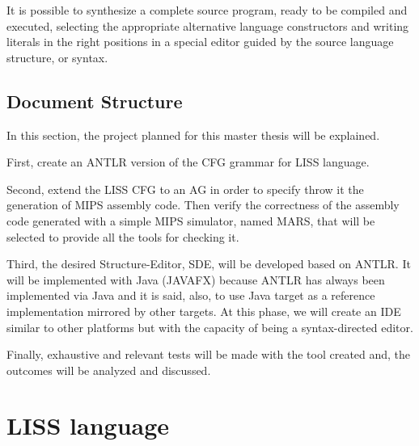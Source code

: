 \documentclass[
  oneside,
  11pt, a4paper,
  footinclude=true,
  headinclude=true,
  cleardoublepage=empty
]{scrbook}
\begin{document}
It is possible to synthesize a complete source program, ready to be compiled and executed, selecting the appropriate alternative language constructors and writing literals in the right positions in a special editor guided by the source language structure, or syntax.


\section{Document Structure}	

In this section, the project planned for this master thesis will be explained.


First, create an ANTLR version of the CFG grammar for LISS language.


Second, extend the LISS CFG to an AG in order to specify throw it the generation of MIPS assembly code.
Then verify the correctness of the assembly code generated with a simple MIPS simulator, named MARS, that will be selected to provide all the tools for checking it.

Third, the desired Structure-Editor, SDE, will be developed based on ANTLR.
It will be implemented with Java (JAVAFX) because ANTLR has always been implemented via Java and it is said, also, to use Java target as a reference implementation mirrored by other targets.
At this phase, we will create an IDE similar to other platforms but with the capacity of being a syntax-directed editor.


Finally, exhaustive and relevant tests will be made with the tool created and, the outcomes will be analyzed and discussed.






\chapter{LISS language}
\end{document}
